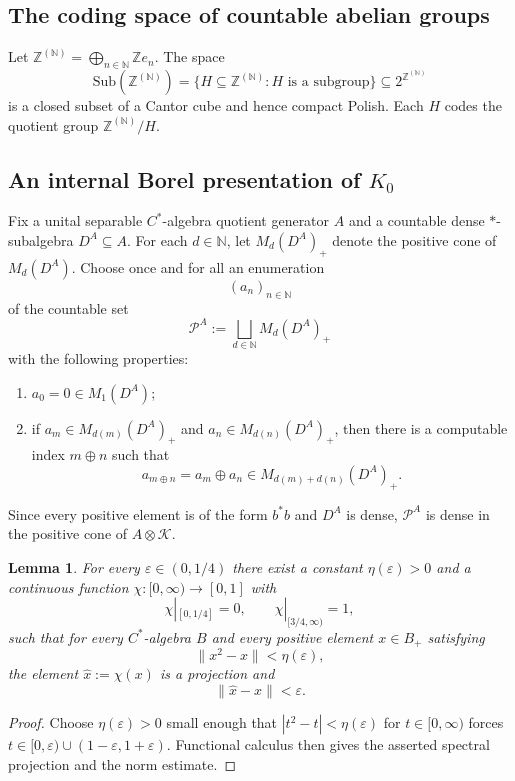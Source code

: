 \documentclass[12pt,fleqn,a4paper]{amsart}
\numberwithin{equation}{section}
\newtheorem{lemma}[theorem]{Lemma}
\theoremstyle{definition}
\newcommand{\N}{\mathbb{N}}
\newcommand{\Z}{\mathbb{Z}}
\newcommand{\Sub}{\mathrm{Sub}}
\begin{document}
\subsection{The coding space of countable abelian groups}

Let $\Z^{(\N)}=\bigoplus_{n\in\N}\Z e_n$.  The space
\[
\Sub(\Z^{(\N)})=\{H\subseteq\Z^{(\N)}:H\text{ is a subgroup}\}\subseteq 2^{\Z^{(\N)}}
\]
is a closed subset of a Cantor cube and hence compact Polish.
Each $H$ codes the quotient group $\Z^{(\N)}/H$.

\subsection{An internal Borel presentation of \texorpdfstring{$K_0$}{K0}}

Fix a unital separable $C^*$-algebra quotient generator $A$ and a countable dense
$*$-subalgebra $D^A\subseteq A$.
For each $d\in\N$, let $M_d(D^A)_+$ denote the positive cone of $M_d(D^A)$.
Choose once and for all an enumeration
\[
(a_n)_{n\in\N}
\]
of the countable set
\[
\mathcal P^A:=\bigsqcup_{d\in\N} M_d(D^A)_+
\]
with the following properties:
\begin{enumerate}
\item $a_0=0\in M_1(D^A)$;
\item if $a_m\in M_{d(m)}(D^A)_+$ and $a_n\in M_{d(n)}(D^A)_+$, then there is a
computable index $m\oplus n$ such that
\[
a_{m\oplus n}=a_m\oplus a_n\in M_{d(m)+d(n)}(D^A)_+.
\]
\end{enumerate}
Since every positive element is of the form $b^*b$ and $D^A$ is dense,
$\mathcal P^A$ is dense in the positive cone of $A\otimes\mathcal K$.

\begin{lemma}
\label{lem:K0-correct-proj}
For every $\varepsilon\in(0,1/4)$ there exist a constant
$\eta(\varepsilon)>0$ and a continuous function
$\chi:[0,\infty)\to[0,1]$ with
\[
\chi|_{[0,1/4]}=0,
\qquad
\chi|_{[3/4,\infty)}=1,
\]
such that for every $C^*$-algebra $B$ and every positive element $x\in B_+$ satisfying
\[
\|x^2-x\|<\eta(\varepsilon),
\]
the element $\widehat x:=\chi(x)$ is a projection and
\[
\|\widehat x-x\|<\varepsilon.
\]
\end{lemma}

\begin{proof}
Choose $\eta(\varepsilon)>0$ small enough that
$|t^2-t|<\eta(\varepsilon)$ for $t\in[0,\infty)$ forces
$t\in[0,\varepsilon)\cup(1-\varepsilon,1+\varepsilon)$.
Functional calculus then gives the asserted spectral projection and the norm estimate.
\end{proof}
\end{document}
